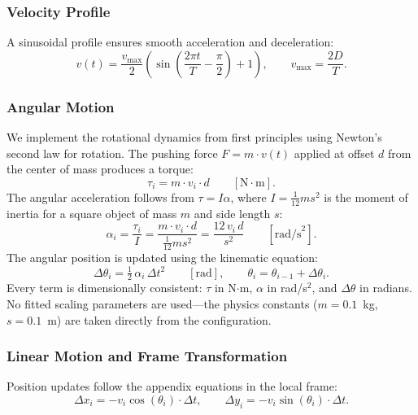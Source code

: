 \documentclass[a4paper]{article}
\begin{document}
\subsubsection{Velocity Profile}

A sinusoidal profile ensures smooth acceleration and deceleration:
\begin{equation}
    v(t) = \frac{v_{\max}}{2}\left(\sin\!\left(\frac{2\pi t}{T} - \frac{\pi}{2}\right) + 1\right), \qquad v_{\max} = \frac{2D}{T}.
\end{equation}

\subsubsection{Angular Motion}

We implement the rotational dynamics from first principles using Newton's second law for rotation. The pushing force $F = m \cdot v(t)$ applied at offset $d$ from the center of mass produces a torque:
\begin{equation}
    \tau_i = m \cdot v_i \cdot d \qquad [\text{N}{\cdot}\text{m}].
\end{equation}
The angular acceleration follows from $\tau = I\alpha$, where $I = \tfrac{1}{12}ms^2$ is the moment of inertia for a square object of mass $m$ and side length $s$:
\begin{equation}
    \alpha_i = \frac{\tau_i}{I} = \frac{m \cdot v_i \cdot d}{\tfrac{1}{12}ms^2} = \frac{12 \, v_i \, d}{s^2} \qquad [\text{rad/s}^2].
\end{equation}
The angular position is updated using the kinematic equation:
\begin{equation}
    \Delta\theta_i = \tfrac{1}{2}\,\alpha_i \, \Delta t^2 \qquad [\text{rad}], \qquad \theta_i = \theta_{i-1} + \Delta\theta_i.
\end{equation}
Every term is dimensionally consistent: $\tau$ in N$\cdot$m, $\alpha$ in rad/s$^2$, and $\Delta\theta$ in radians. No fitted scaling parameters are used---the physics constants ($m = 0.1$~kg, $s = 0.1$~m) are taken directly from the configuration.

\subsubsection{Linear Motion and Frame Transformation}

Position updates follow the appendix equations in the local frame:
\begin{equation}
    \Delta x_i = -v_i \cos(\theta_i) \cdot \Delta t, \qquad \Delta y_i = -v_i \sin(\theta_i) \cdot \Delta t.
\end{equation}
\end{document}
